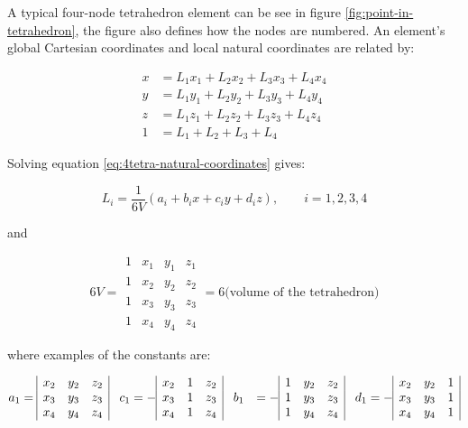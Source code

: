 A typical four-node tetrahedron element can be see in figure
\vref{fig:point-in-tetrahedron}, the figure also defines how the nodes
are numbered. An element's global Cartesian coordinates and local
natural coordinates are related by:

\begin{equation}
\label{eq:4tetra-natural-coordinates}
\begin{aligned}
  x &= L_1 x_1 + L_2 x_2 + L_3 x_3 + L_4 x_4 \\
  y &= L_1 y_1 + L_2 y_2 + L_3 y_3 + L_4 y_4 \\
  z &= L_1 z_1 + L_2 z_2 + L_3 z_3 + L_4 z_4 \\
  1 &= L_1 + L_2 + L_3 + L_4
\end{aligned}
\end{equation}

Solving equation \eqref{eq:4tetra-natural-coordinates} gives:

\begin{equation}
\label{eq:li}
  L_i = \frac{1}{6V} ( a_i + b_i x + c_i y + d_i z), \qquad i = 1,2,3,4
\end{equation}

and

\begin{equation}
\label{eq:volume-of-tetrahedron}
6V =
\begin{array}{|cccc|}
1 & x_1 & y_1 & z_1 \\
1 & x_2 & y_2 & z_2 \\
1 & x_3 & y_3 & z_3 \\
1 & x_4 & y_4 & z_4
\end{array}
= 6 \mbox{(volume of the tetrahedron)}
\end{equation}

where examples of the constants are:

\begin{equation}
\begin{aligned}
a_1 &= 
\begin{array}{|ccc|}
x_2 & y_2 & z_2 \\
x_3 & y_3 & z_3 \\
x_4 & y_4 & z_4
\end{array}
\hspace{3mm}
c_1 = -
\begin{array}{|ccc|}
x_2 & 1 & z_2 \\
x_3 & 1 & z_3 \\
x_4 & 1 & z_4
\end{array}
\hspace{3mm}
b_1 &= -
\begin{array}{|ccc|}
1 & y_2 & z_2 \\
1 & y_3 & z_3 \\
1 & y_4 & z_4
\end{array}
\hspace{3mm}
d_1 = -
\begin{array}{|ccc|}
x_2 & y_2 & 1 \\
x_3 & y_3 & 1 \\
x_4 & y_4 & 1
\end{array}
\end{aligned}
\end{equation}

